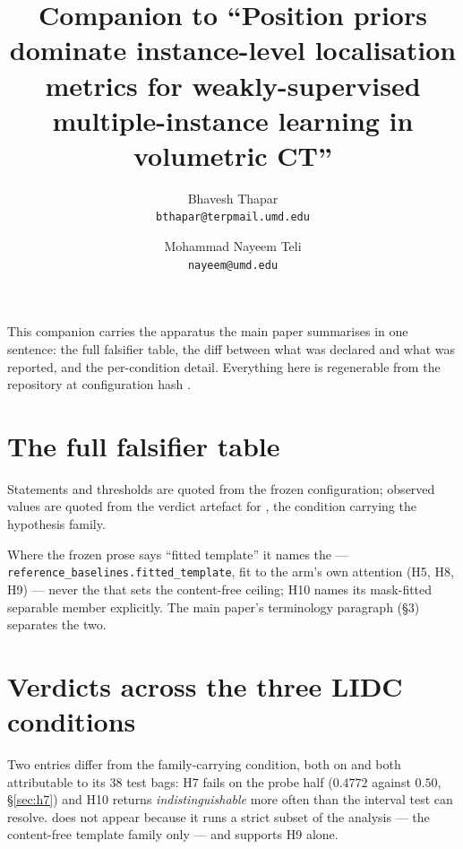 \documentclass[10pt]{article}
\title{Companion to ``Position priors dominate instance-level localisation
metrics for weakly-supervised multiple-instance learning in volumetric CT''}
\author{
  Bhavesh Thapar\\
  \texttt{bthapar@terpmail.umd.edu}
  \and
  Mohammad Nayeem Teli\\
  \texttt{nayeem@umd.edu}
}
\date{}
\begin{document}
\maketitle

This companion carries the apparatus the main paper summarises in one sentence:
the full falsifier table, the diff between what was declared and what was
reported, and the per-condition detail. Everything here is regenerable from the
repository at configuration hash \preghash{}.

\section{The full falsifier table}

Statements and thresholds are quoted from the frozen configuration; observed
values are quoted from the verdict artefact for \condA{}, the condition carrying
the hypothesis family.

\begin{center}\small

\end{center}

\noindent Where the frozen prose says ``fitted template'' it names the
\attden{} --- \texttt{reference\_baselines.fitted\_template}, fit to the arm's
own attention (H5, H8, H9) --- never the \maskref{} that sets the content-free
ceiling; H10 names its mask-fitted separable member explicitly. The main
paper's terminology paragraph (\S3) separates the two.

\section{Verdicts across the three LIDC conditions}

\begin{center}

\end{center}

\noindent Two entries differ from the family-carrying condition, both on
\condC{} and both attributable to its $38$ test bags: H7 fails on the probe half
($0.4772$ against $0.50$, \S\ref{sec:h7}) and H10 returns
\emph{indistinguishable} more often than the interval test can resolve.
\condD{} does not appear because it runs a strict subset of the analysis --- the
content-free template family only --- and supports H9 alone.

\end{document}
